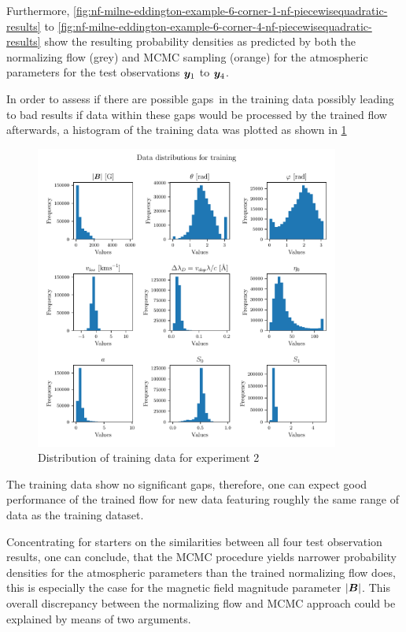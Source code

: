 \documentclass[a4paper,12pt]{report}
\begin{document}
Furthermore, \cref{fig:nf-milne-eddington-example-6-corner-1-nf-piecewisequadratic-results} to \cref{fig:nf-milne-eddington-example-6-corner-4-nf-piecewisequadratic-results} show the resulting probability densities as predicted by both the normalizing flow (grey) and MCMC sampling (orange) for the atmospheric parameters for the test observations $\bm{y}_1$ to $\bm{y}_4$.

In order to assess if there are possible \flqq gaps\frqq\ in the training data possibly leading to bad results if data within these gaps would be processed by the trained flow afterwards, a histogram of the training data was plotted as shown in \cref{fig:nf-milne-eddington-example-6-datadistributiontraining-nflows-piecewisequadratic}
\begin{figure}[h]
\centering
\includegraphics[width=10cm]{figures/nf-milne-eddington-example-6-datadistributiontraining-nflows-piecewisequadratic.pdf}
\caption{Distribution of training data for experiment 2}
\label{fig:nf-milne-eddington-example-6-datadistributiontraining-nflows-piecewisequadratic}
\end{figure}
The training data show no significant gaps, therefore, one can expect good performance of the trained flow for new data featuring roughly the same range of data as the training dataset.

Concentrating for starters on the similarities between all four test observation results, one can conclude, that the MCMC procedure yields narrower probability densities for the atmospheric parameters than the trained normalizing flow does, this is especially the case for the magnetic field magnitude parameter $|\bm{B}|$. This overall discrepancy between the normalizing flow and MCMC approach could be explained by means of two arguments. 
\end{document}
